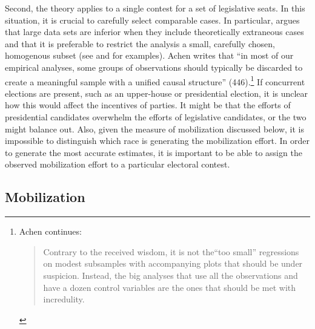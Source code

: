 \documentclass[12pt]{article}
\begin{document}
Second, the theory applies to a single contest for a set of legislative seats. In this situation, it is crucial to carefully select comparable cases. In particular, \cite{Achen2005} argues that large data sets are inferior when they include theoretically extraneous cases and that it is preferable to restrict the analysis a small, carefully chosen, homogenous subset (see \citealt{Gowa1999} and \citealt{Miller1999} for examples). Achen writes that ``in most of our empirical analyses, some groups of observations should typically be discarded to create a meaningful sample with a unified causal structure'' (446).\footnote{Achen continues: \begin{quote} Contrary to the received wisdom, it is not the``too small'' regressions on modest subsamples with accompanying plots that should be under suspicion. Instead, the big analyses that use all the observations and have a dozen control variables are the ones that should be met with incredulity. \end{quote}} If concurrent elections are present, such as an upper-house or presidential election, it is unclear how this would affect the incentives of parties. It might be that the efforts of presidential candidates overwhelm the efforts of legislative candidates, or the two might balance out. Also, given the measure of mobilization discussed below, it is impossible to distinguish which race is generating the mobilization effort. In order to generate the most accurate estimates, it is important to be able to assign the observed mobilization effort to a particular electoral contest.

\subsection*{Mobilization}
\end{document}
